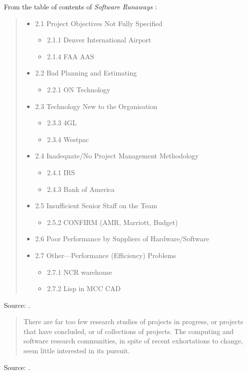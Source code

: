 \documentclass[a4paper]{article}
\begin{document}
From the table of contents of \emph{Software Runaways} \cite{Glass1997}:
\begin{quote}
	\begin{itemize}
		\item 2.1 Project Objectives Not Fully Specified
			\begin{itemize}
				\item 2.1.1 Denver International Airport
				\item 2.1.4 FAA AAS
			\end{itemize}
		\item 2.2 Bad Planning and Estimating
			\begin{itemize}
				\item 2.2.1 ON Technology
			\end{itemize}
		\item 2.3 Technology New to the Organisation
			\begin{itemize}
				\item 2.3.3 4GL
				\item 2.3.4 Westpac
			\end{itemize}
		\item 2.4 Inadequate/No Project Management Methodology
			\begin{itemize}
				\item 2.4.1 IRS
				\item 2.4.3 Bank of America
			\end{itemize}
		\item 2.5 Insufficient Senior Staff on the Team
			\begin{itemize}
				\item 2.5.2 CONFIRM (AMR, Marriott, Budget)
			\end{itemize}
		\item 2.6 Poor Performance by Suppliers of Hardware/Software
		\item 2.7 Other---Performance (Efficiency) Problems
			\begin{itemize}
				\item 2.7.1 NCR warehouse
				\item 2.7.2 Lisp in MCC CAD
			\end{itemize}
	\end{itemize}
\end{quote}
Source: \cite[vii--viii]{Glass1997}.
\medskip

\begin{quote}
	There are far too few research studies of projects in progress, or projects that have
concluded, or of collections of projects.  The computing and software research communities, in
spite of recent exhortations to change, seem little interested in its pursuit.
\end{quote}
Source: \cite[p.~244]{Glass1997}.
\medskip
\end{document}
